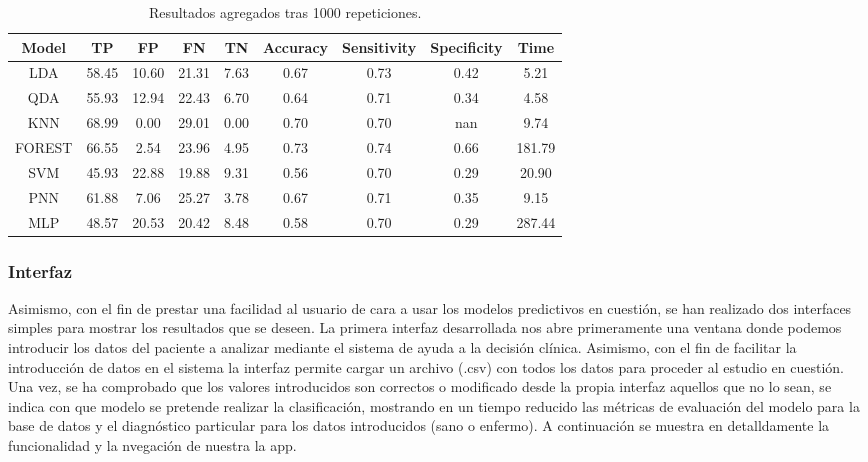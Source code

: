 \documentclass{article}
\begin{document}
\vfill
\begin{table}[h!]
\centering
\begin{tabular}{|c|c|c|c|c|c|c|c|c|}
\hline
Model  & TP    & FP    & FN    & TN   & Accuracy & Sensitivity & Specificity & Time\\
\hline
   LDA & 58.45 & 10.60 & 21.31 & 7.63 &  0.67    & 0.73        & 0.42        & 5.21\\
   QDA & 55.93 & 12.94 & 22.43 & 6.70 &  0.64    & 0.71        & 0.34        & 4.58\\
   KNN & 68.99 & 0.00  & 29.01 & 0.00 &  0.70    & 0.70        & nan         & 9.74\\
FOREST & 66.55 & 2.54  & 23.96 & 4.95 &  0.73    & 0.74        & 0.66        & 181.79\\
   SVM & 45.93 & 22.88 & 19.88 & 9.31 &  0.56    & 0.70        & 0.29        & 20.90\\
   PNN & 61.88 & 7.06  & 25.27 & 3.78 &  0.67    & 0.71        & 0.35        & 9.15\\
   MLP & 48.57 & 20.53 & 20.42 & 8.48 &  0.58    & 0.70        & 0.29        & 287.44\\
\hline
\end{tabular}
\caption{Resultados agregados tras 1000 repeticiones.}
\label{table:}
\end{table}


\vfill

\subsubsection{Interfaz}

Asimismo, con el fin de prestar una facilidad al usuario de cara a
usar los modelos predictivos en cuestión, se han realizado dos
interfaces simples para mostrar los resultados que se deseen. La
primera interfaz desarrollada nos abre primeramente una ventana donde
podemos introducir los datos del paciente a analizar mediante el
sistema de ayuda a la decisión clínica. Asimismo, con el fin de
facilitar la introducción de datos en el sistema la interfaz permite
cargar un archivo (.csv) con todos los datos para proceder al estudio
en cuestión. Una vez, se ha comprobado que los valores introducidos
son correctos o modificado desde la propia interfaz aquellos que no lo
sean, se indica con que modelo se pretende realizar la clasificación,
mostrando en un tiempo reducido las métricas de evaluación del modelo
para la base de datos y el diagnóstico particular para los datos
introducidos (sano o enfermo). A continuación se muestra en
detalldamente la funcionalidad y la nvegación de nuestra la app.
\end{document}
